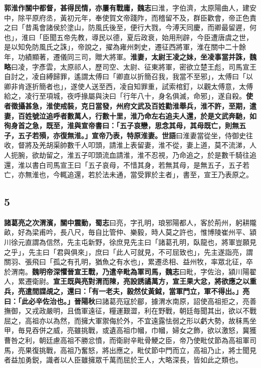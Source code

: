 \textbf{郭淮作關中都督，甚得民情，亦屢有戰庸，}{\footnotesize \textbf{魏志}曰淮，字伯濟，太原陽曲人，建安中，除平原府丞，黃初元年，奉使賀文帝踐阼，而稽留不及，群臣歡會，帝正色責之曰「昔禹會諸侯於塗山，防風氏後至，便行大戮，今溥天同慶，而卿最留遲，何也」，淮曰「臣聞五帝先教，導民以德，夏后政衰，始用刑辟，今臣遭唐虞之世，是以知免防風氏之誅」，帝說之，擢為雍州刺史，遷征西將軍，淮在關中二十餘年，功績顯著，遷儀同三司，贈大將軍。}\textbf{淮妻，太尉王凌之妹，坐凌事當并誅，}{\footnotesize \textbf{魏略}曰凌，字彥雲，太原祁人，歷司空、太尉、征東將軍，密欲立楚王彪，司馬宣王自討之，凌自縛歸罪，遙謂太傅曰「卿直以折簡召我，我當不至邪」，太傅曰「以卿非肯逐折簡者也」，遂使人送至西，凌自知罪重，試索棺釘，以觀太傅意，太傅給之，凌行至項城，夜呼掾屬與決曰「行年八十，身名俱滅，命邪」，遂自殺。}\textbf{使者徵攝甚急，淮使戒裝，克日當發，州府文武及百姓勸淮舉兵，淮不許，至期，遣妻，百姓號泣追呼者數萬人，行數十里，淮乃命左右追夫人還，於是文武奔馳，如徇身首之急，既至，淮與宣帝書曰：「五子哀戀，思念其母，其母既亡，則無五子，五子若殞，亦復無淮。」宣帝乃表，特原淮妻。}{\footnotesize \textbf{世語}曰淮妻當從坐，侍御史往收，督將及羌胡渠帥數千人叩頭，請淮上表留妻，淮不從，妻上道，莫不流涕，人人扼腕，欲劫留之，淮五子叩頭流血請淮，淮不忍視，乃命追之，於是數千騎往追還，淮以書白司馬宣王曰「五子哀母，不惜其身，若無其母，是無五子，五子若亡，亦無淮也，今輒追還，若於法未通，當受罪於主者」，書至，宣王乃表原之。}

\subsection*{5}

\textbf{諸葛亮之次渭濱，關中震動，}{\footnotesize \textbf{蜀志}曰亮，字孔明，琅邪陽都人，客於荊州，躬耕隴畝，好為梁甫吟，長八尺，毎自比管仲、樂毅，時人莫之許也，惟博陵崔州平、潁川徐元直謂為信然，先主屯新野，徐庶見先主曰「諸葛孔明，臥龍也，將軍豈願見之乎」，先主曰「君與俱來」，庶曰「此人可就見，不可屈致也」，先主遂詣亮，謂關羽、張飛曰「孤之有孔明，猶魚之有水也」，累遷丞相、益州牧，率眾北征，卒於渭南。}\textbf{魏明帝深懼晉宣王戰，乃遣辛毗為軍司馬，}{\footnotesize \textbf{魏志}曰毗，字佐治，潁川陽翟人，累遷衛尉。}\textbf{宣王既與亮對渭而陳，亮設誘譎萬方，宣王果大忿，將欲應之以重兵，亮遣間諜覘之，還曰：「有一老夫，毅然仗黃鉞，當軍門立，軍不得出。」亮曰：「此必辛佐治也。」}{\footnotesize \textbf{晉陽秋}曰諸葛亮寇於郿，據渭水南原，詔使高祖拒之，亮善撫御，又戎政嚴明，且僑軍遠征，糧運艱澀，利在野戰，朝廷毎聞其出，欲以不戰屈之，高祖亦以為然，而擁大軍禦侮於外，不宜遠露怯弱之形以虧大勢，故秣馬坐甲，毎見吞併之威，亮雖挑戰，或遺高祖巾幗，巾幗，婦女之飾，欲以激怒，冀獲曹咎之利，朝廷慮高祖不勝忿憤，而衛尉辛毗骨鯁之臣，帝乃使毗仗節為高祖軍司馬，亮果復挑戰，高祖乃奮怒，將出應之，毗仗節中門而立，高祖乃止，將士聞見者益加勇鋭，識者以人臣雖擁眾千萬而屈於王人，大略深長，皆如此之類也。}

